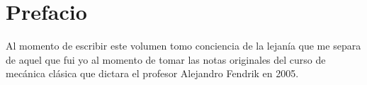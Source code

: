 \thispagestyle{empty}
\chapter*{Prefacio}

Al momento de escribir este volumen tomo conciencia de la lejanía que me separa de aquel que fui yo al momento de tomar 
las notas originales del curso de mecánica clásica que dictara el profesor Alejandro Fendrik en 2005.

